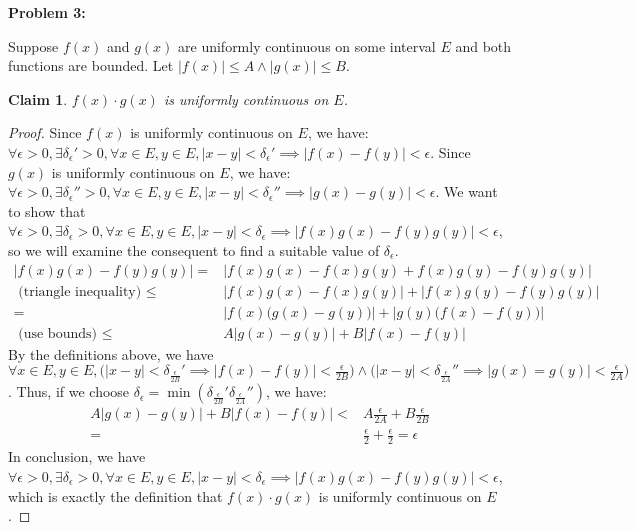 \documentclass{article}
\newcommand{\eps}{\ensuremath{\epsilon}}
\newcommand{\pt}[1]{\textrm{ #1 }}
\newtheorem{clm}{Claim}
\begin{document}
\textbf{Problem 3:}

Suppose $f(x)$ and $g(x)$
are uniformly continuous on some interval $E$
and both functions are bounded.
Let $|f(x)| \le A \land |g(x)| \le B$.

\begin{clm}
	$f(x) \cdot g(x)$ is uniformly continuous on $E$.
\end{clm}

\begin{proof}
	Since $f(x)$ is uniformly continuous on $E$, we have:
	$\forall \eps > 0,
	\exists \delta_\eps' > 0,
	\forall x \in E, y \in E,
	|x - y| < \delta_\eps'
	\implies |f(x) - f(y)| < \eps$.
	Since $g(x)$ is uniformly continuous on $E$, we have:
	$\forall \eps > 0,
	\exists \delta_\eps'' > 0,
	\forall x \in E, y \in E,
	|x - y| < \delta_\eps''
	\implies |g(x) - g(y)| < \eps$.
	We want to show that
	$\forall \eps > 0,
	\exists \delta_\eps > 0,
	\forall x \in E, y \in E,
	|x - y| < \delta_\eps
	\implies |f(x) g(x) - f(y)g(y)| < \eps$,
	so we will examine the consequent to find a suitable value of $\delta_\eps$.
	\begin{align}
		|f(x)g(x) - f(y)g(y)| = & |f(x)g(x) - f(x)g(y) + f(x) g(y) -f(y)g(y)| \\
		\pt{(triangle inequality)} \le & |f(x)g(x) - f(x)g(y)| + |f(x) g(y) -f(y)g(y)| \\
		= & |f(x)\big(g(x) - g(y)\big)| + |g(y)\big(f(x) -f(y)\big)| \\
		\pt{(use bounds)} \le & A|g(x) - g(y)| + B|f(x) - f(y)|
	\end{align}
	By the definitions above,
	we have $\forall x \in E, y \in E, \Big(|x - y| < \delta_{\frac{\eps}{2B}}' \implies |f(x) - f(y)| < \frac{\eps}{2B}\Big) \land
	\Big(|x - y| < \delta_{\frac{\eps}{2A}}'' \implies |g(x) = g(y)| < \frac{\eps}{2A}\Big)$.
	Thus, if we choose $\delta_\eps = \min( \delta_{\frac{\eps}{2B}}' \delta_{\frac{\eps}{2A}}'')$,
	we have:
	\begin{align}
		A|g(x) - g(y)| + B|f(x) - f(y)| < & A\frac{\eps}{2A} + B\frac{\eps}{2B} \\
		= & \frac{\eps}{2} + \frac{\eps}{2} = \eps
	\end{align}
	In conclusion, we have
	$\forall \eps > 0,
	\exists \delta_\eps > 0,
	\forall x \in E, y \in E,
	|x - y| < \delta_\eps
	\implies |f(x) g(x) - f(y)g(y)| < \eps$,
	which is exactly the definition that
	$f(x) \cdot g(x)$ is uniformly continuous on $E$.
\end{proof}
\end{document}
